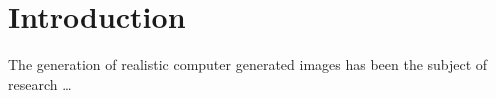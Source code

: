 \chapter{Introduction}
\label{ch:Introduction}
The generation of realistic computer generated images has been the subject of research \dots